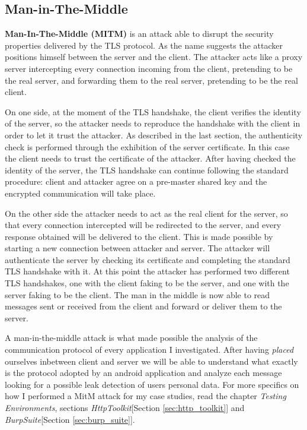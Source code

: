 		\subsection{Man-in-The-Middle}
		\label{subsec:mitm}
			\par \textbf{Man-In-The-Middle (MITM)} is an attack able to disrupt the security properties delivered by the TLS protocol. As the name suggests the attacker positions himself between the server and the client. The attacker acts like a proxy server intercepting every connection incoming from the client, pretending to be the real server, and forwarding them to the real server, pretending to be the real client. 
			\par On one side, at the moment of the TLS handshake, the client verifies the identity of the server, so the attacker needs to reproduce the handshake with the client in order to let it trust the attacker. As described in the last section, the authenticity check is performed through the exhibition of the server certificate. In this case the client needs to trust the certificate of the attacker. After having checked the identity of the server, the TLS handshake can continue following the standard procedure: client and attacker agree on a pre-master shared key and the encrypted communication will take place.
			\par On the other side the attacker needs to act as the real client for the server, so that every connection intercepted will be redirected to the server, and every response obtained will be delivered to the client. This is made possible by starting a new connection between attacker and server. The attacker will authenticate the server by checking its certificate and completing the standard TLS handshake with it. \newline
			At this point the attacker has performed two different TLS handshakes, one with the client faking to be the server, and one with the server faking to be the client. The man in the middle is now able to read messages sent or received from the client and forward or deliver them to the server. \newline
			\par A man-in-the-middle attack is what made possible the analysis of the communication protocol of every application I investigated. After having \textit{placed} ourselves inbetween client and server we will be able to understand what exactly is the protocol adopted by an android application and analyze each message looking for a possible leak detection of users personal data. For more specifics on how I performed a MitM attack for my case studies, read the chapter \textit{Testing Environments}, sections \textit{HttpToolkit}[Section \ref{sec:http_toolkit}] and \textit{BurpSuite}[Section \ref{sec:burp_suite}].
			
